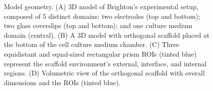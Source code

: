 \begin{figure}
\caption{Model geometry. (A) \acs{3D} model of Brighton's experimental setup, composed of 5 distinct domains: two electrodes (top and bottom); two glass coverslips (top and bottom); and one culture medium domain (central). (B) A \acs{3D} model with orthogonal scaffold placed at the bottom of the cell culture medium chamber. (C) Three equidistant and equal-sized rectangular prism \acs{ROI}s (tinted blue) represent the scaffold environment's external, interface, and internal regions. (D) Volumetric view of the orthogonal scaffold with overall dimensions and the \acs{ROI}s (tinted blue).}
\label{fig5d2}
\end{figure}


